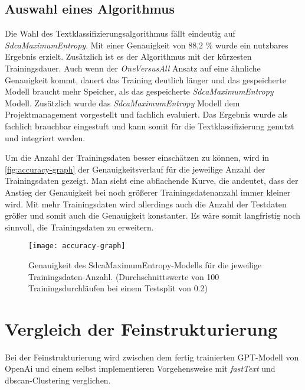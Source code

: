 \subsection{Auswahl eines Algorithmus}
\label{c:comparison:classification:selection}
Die Wahl des Textklassifizierungsalgorithmus fällt eindeutig auf \textit{SdcaMaximumEntropy}. Mit einer Genauigkeit von 88,2 \% wurde ein nutzbares Ergebnis erzielt. Zusätzlich ist es der Algorithmus mit der kürzesten Trainingsdauer. Auch wenn der \textit{OneVersusAll} Ansatz auf eine ähnliche Genauigkeit kommt, dauert das Training deutlich länger und das gespeicherte Modell braucht mehr Speicher, als das gespeicherte \textit{SdcaMaximumEntropy} Modell. 
Zusätzlich wurde das \textit{SdcaMaximumEntropy} Modell dem Projektmanagement vorgestellt und fachlich evaluiert. Das Ergebnis wurde als fachlich brauchbar eingestuft und kann somit für die Textklassifizierung genutzt und integriert werden.

Um die Anzahl der Trainingsdaten besser einschätzen zu können, wird in \autoref{fig:accuracy-graph} der Genauigkeitsverlauf für die jeweilige Anzahl der Trainingsdaten gezeigt. Man sieht eine abflachende Kurve, die andeutet, dass der Anstieg der Genauigkeit bei noch größerer Trainingsdatenanzahl immer kleiner wird. Mit mehr Trainingsdaten wird allerdings auch die Anzahl der Testdaten größer und somit auch die Genauigkeit konstanter. Es wäre somit langfristig noch sinnvoll, die Trainingsdaten zu erweitern.

\begin{figure}[h]
	\centering
	\texttt{[image: accuracy-graph]}
	\caption[Accuracy]{Genauigkeit des SdcaMaximumEntropy-Modells für die jeweilige Trainingsdaten-Anzahl. (Durchschnittswerte von 100 Trainingsdurchläufen bei einem Testsplit von 0.2)}
	\label{fig:accuracy-graph}
\end{figure}

\section{Vergleich der Feinstrukturierung}
\label{c:comparison:fine-structuring}
Bei der Feinstrukturierung wird zwischen dem fertig trainierten GPT-Modell von OpenAi und einem selbst implementieren Vorgehensweise mit \textit{fastText} und \ac{dbscan}-Clustering verglichen.
